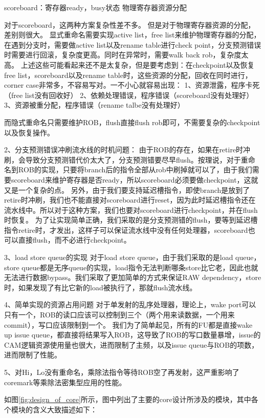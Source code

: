 \documentclass[lang=cn,11pt,a4paper]{elegantpaper}
\begin{document}
scoreboard：寄存器ready，busy状态
物理寄存器资源分配

对于scoreboard，这两种方案复杂性差不多。
但是对于物理寄存器资源的分配，差别则很大。
显式重命名需要实现active list，free list来维护物理寄存器的分配，在遇到分支时，需要做active list以及rename table进行check point，分支预测错误时需要进行回滚，复杂度更高。同时在异常时，需要walk back rob，复杂度太高。
上述这些可能看起来还不是太复杂，但是要考虑到：在checkpoint以及恢复free list，scoreboard以及rename table时，这些资源的分配，回收在同时进行，corner case非常多，不容易写对。一不小心就容易出现：
1、资源泄露，程序卡死（free list没有回收好）
2、依赖处理错误，程序错误（scoreboard没有处理好）
3、资源被重分配，程序错误（rename talbe没有处理好）

而隐式重命名只需要维护ROB，flush直接flush rob即可，不需要复杂的checkpoint以及恢复操作。

2、分支预测错误冲刷流水线的时机问题：
由于ROB的存在，如果在retire时冲刷，会导致分支预测错代价太大了，分支预测错要尽早flush。按理说，对于重命名到ROB的实现，只要将branch后的指令全部从rob中刷掉就可以了，由于我们需要scoreboard来维护寄存器是否ready，所以scoreboard必须要做checkpoint，这就又是一个复杂的点。
另外，由于我们要支持延迟槽指令，即使branch是放到了retire时冲刷，我们也不能直接对scoreboard进行reset，因为此时延迟槽指令还在流水线中。所以对于这种方案，我们也要对scoreboard进行checkpoint，并在flush时恢复。
为了让实现简单正确，我们采取的是分支预测错的flush，要等到延迟槽指令retire时，才发出，这样子可以保证流水线中没有任何处理器，scoreboard也可以直接flush，而不必进行checkpoint。

3、load store queue的实现
对于load store queue，由于我们采取的是load queue，store queue都是无序queue的实现，load指令无法判断哪条store比它老，因此也就无法进行数据bypass。我们采取了更加简单的方式来保证RAW dependency，store时，如果发现了有比它新的load被执行了，那就flush流水线。

4、简单实现的资源占用问题
对于单发射的乱序处理器，理论上，wake port可以只有一个，ROB的读口应该可以控制到三个（两个用来读数据，一个用来commit），写口应该限制到一个。
我们为了简单起见，所有的FU都是直接wake up issue queue，都直接将结果写入ROB，这导致了ROB的写口数量暴增，issue的CAM逻辑资源使用量也很大，进而限制了主频，以及issue queue与ROB的项数，进而限制了性能。

5、对Hi，Lo没有重命名，乘除法指令等待ROB空了再发射，这严重影响了coremark等乘除法密集型应用的性能。



如图\ref{fig:design_of_core}所示，图中列出了主要的core设计所涉及的模块，其中各个模块的含义大致描述如下：
\end{document}
